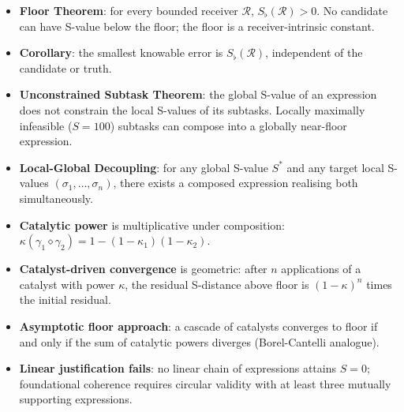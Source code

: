 \bigskip
\begin{tcolorbox}[colback=crownblue!5, colframe=crownblue!60!black,
                  title={\textbf{Chapter 14 Summary}}]
\begin{itemize}[noitemsep]
  \item \textbf{Floor Theorem}: for every bounded receiver $\mathcal{R}$,
    $S_{\flat}(\mathcal{R}) > 0$.  No candidate can have S-value below the
    floor; the floor is a receiver-intrinsic constant.
  \item \textbf{Corollary}: the smallest knowable error is
    $S_{\flat}(\mathcal{R})$, independent of the candidate or truth.
  \item \textbf{Unconstrained Subtask Theorem}: the global S-value of an
    expression does not constrain the local S-values of its subtasks.
    Locally maximally infeasible ($S=100$) subtasks can compose into a globally
    near-floor expression.
  \item \textbf{Local-Global Decoupling}: for any global S-value $S^{*}$ and
    any target local S-values $(\sigma_1,\ldots,\sigma_n)$, there exists a
    composed expression realising both simultaneously.
  \item \textbf{Catalytic power} is multiplicative under composition:
    $\kappa(\gamma_1 \diamond \gamma_2) = 1 - (1-\kappa_1)(1-\kappa_2)$.
  \item \textbf{Catalyst-driven convergence} is geometric: after $n$
    applications of a catalyst with power $\kappa$, the residual S-distance
    above floor is $(1-\kappa)^n$ times the initial residual.
  \item \textbf{Asymptotic floor approach}: a cascade of catalysts converges
    to floor if and only if the sum of catalytic powers diverges
    (Borel-Cantelli analogue).
  \item \textbf{Linear justification fails}: no linear chain of expressions
    attains $S=0$; foundational coherence requires circular validity with at
    least three mutually supporting expressions.
\end{itemize}
\end{tcolorbox}
